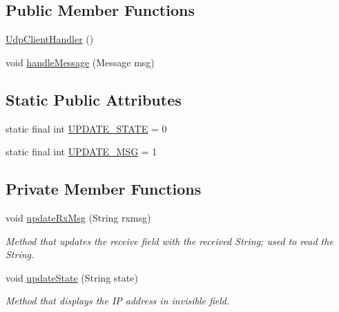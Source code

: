\subsection*{Public Member Functions}
\begin{DoxyCompactItemize}
\item 
\mbox{\hyperlink{classcom_1_1example_1_1trainawearapplication_1_1_udp_client_handler_ab5ff425dbf594d074ab709f2be441419}{Udp\+Client\+Handler}} ()
\item 
void \mbox{\hyperlink{classcom_1_1example_1_1trainawearapplication_1_1_udp_client_handler_a433f624fad2243aaed2e97f7f3cb8434}{handle\+Message}} (Message msg)
\end{DoxyCompactItemize}
\subsection*{Static Public Attributes}
\begin{DoxyCompactItemize}
\item 
static final int \mbox{\hyperlink{classcom_1_1example_1_1trainawearapplication_1_1_udp_client_handler_abb97ab46d1d8c23159f9ea1319425a5c}{U\+P\+D\+A\+T\+E\+\_\+\+S\+T\+A\+TE}} = 0
\item 
static final int \mbox{\hyperlink{classcom_1_1example_1_1trainawearapplication_1_1_udp_client_handler_ae0a5ca10db5db46916ca3a3acb7416b8}{U\+P\+D\+A\+T\+E\+\_\+\+M\+SG}} = 1
\end{DoxyCompactItemize}
\subsection*{Private Member Functions}
\begin{DoxyCompactItemize}
\item 
void \mbox{\hyperlink{classcom_1_1example_1_1trainawearapplication_1_1_udp_client_handler_a8fa21c06cef3adafc938dc19ecc232ab}{update\+Rx\+Msg}} (String rxmsg)
\begin{DoxyCompactList}\small\item\em Method that updates the receive field with the received String; used to read the String. \end{DoxyCompactList}\item 
void \mbox{\hyperlink{classcom_1_1example_1_1trainawearapplication_1_1_udp_client_handler_a65fd50027c6302d5c8d858e844fc3e6f}{update\+State}} (String state)
\begin{DoxyCompactList}\small\item\em Method that displays the IP address in invisible field. \end{DoxyCompactList}\end{DoxyCompactItemize}
